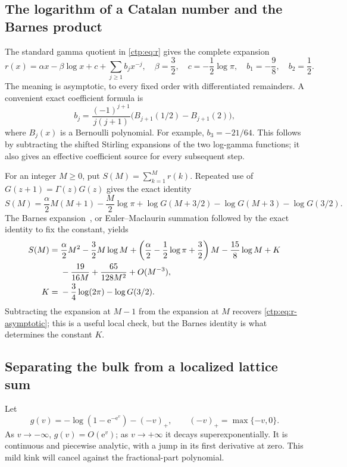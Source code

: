 \documentclass[11pt,a4paper]{article}
\numberwithin{equation}{section}
\theoremstyle{definition}
\theoremstyle{remark}
\newcommand{\e}{\mathrm e}
\begin{document}
\subsection{The logarithm of a Catalan number and the Barnes product}
The standard gamma quotient in \eqref{ctp:eq:r} gives the complete expansion
\begin{equation}\label{ctp:eq:r-asymptotic}
 r(x)=\alpha x-\beta\log x+c+\sum_{j\geq1}b_jx^{-j},
 \quad
 \beta=\frac32,\quad c=-\frac12\log\pi,
 \quad b_1=-\frac98,\quad b_2=\frac12.
\end{equation}
The meaning is asymptotic, to every fixed order with differentiated
remainders. A convenient exact coefficient formula is
\begin{equation}\label{ctp:eq:bj}
 b_j=\frac{(-1)^{j+1}}{j(j+1)}
 \bigl(B_{j+1}(1/2)-B_{j+1}(2)\bigr),
\end{equation}
where $B_j(x)$ is a Bernoulli polynomial. For example,
$b_3=-21/64$. This follows by subtracting the shifted Stirling expansions
of the two log-gamma functions; it also gives an effective coefficient
source for every subsequent step.

For an integer $M\geq0$, put $S(M)=\sum_{k=1}^Mr(k)$. Repeated use of
$G(z+1)=\Gamma(z)G(z)$ gives the exact identity
\begin{equation}\label{ctp:eq:S-exact}
 S(M)=\frac\alpha2M(M+1)-\frac M2\log\pi+
 \log G(M+3/2)-\log G(M+3)-\log G(3/2).
\end{equation}
The Barnes expansion~\cite{dlmfG}, or Euler--Maclaurin summation followed
by the exact identity to fix the constant, yields
\begin{align}
 S(M)={}&\frac\alpha2M^2-\frac32M\log M+
 \left(\frac\alpha2-\frac12\log\pi+\frac32\right)M
 -\frac{15}{8}\log M+K \notag\\
 &-\frac{19}{16M}+\frac{65}{128M^2}+O(M^{-3}),
 \label{ctp:eq:S-asymptotic}\\
 K={}&-\frac34\log(2\pi)-\log G(3/2).\label{ctp:eq:K}
\end{align}
Subtracting the expansion at $M-1$ from the expansion at $M$ recovers
\eqref{ctp:eq:r-asymptotic}; this is a useful local check, but the Barnes
identity is what determines the constant $K$.

\subsection{Separating the bulk from a localized lattice sum}
Let
\begin{equation}\label{ctp:eq:g}
 g(v)=-\log(1-\e^{-\e^v})-(-v)_+,
 \qquad (-v)_+=\max\{-v,0\}.
\end{equation}
As $v\to-\infty$, $g(v)=O(\e^v)$; as $v\to+\infty$ it decays
superexponentially. It is continuous and piecewise analytic, with a jump
in its first derivative at zero. This mild kink will cancel against the
fractional-part polynomial.
\end{document}
